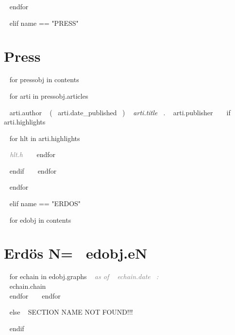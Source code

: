 ~{ endfor }~



~{ elif name == "PRESS" }~

\section{Press}

~{ for pressobj in contents }~ 
\begin{etaremune}[itemindent=-1.5\bibhang, topsep=0pt,
				   itemsep=\bibsep,partopsep=0pt,parsep=0pt,leftmargin={\bibhang+\widthof{[999]}}] 
    
    ~{ for arti in pressobj.articles }~
    \item ~{{ arti.author }}~ (~{{ arti.date_published }}~) \textit{~{{ arti.title }}~}. ~{{ arti.publisher }}~
     ~{ if arti.highlights }~
     	\begin{innerlist}
     	~{ for hlt in arti.highlights }~
	     \item  \textcolor{grey}{\textit{~{{ hlt.h }}~} }
     	~{ endfor }~
     	\end{innerlist}
     ~{ endif }~
	~{ endfor }~


\end{etaremune}
~{ endfor }~



%
%



~{ elif name == "ERDOS" }~

~{ for edobj in contents }~
\section{Erdös N=~{{ edobj.eN }}~}
~{ for echain in edobj.graphs }~
\textit{\textcolor{grey}{as of ~{{ echain.date }}~:}}\\
~{{ echain.chain }}~\\

~{ endfor }~
~{ endfor }~


~{ else }~
SECTION NAME NOT FOUND!!!


~{ endif }~


%	




